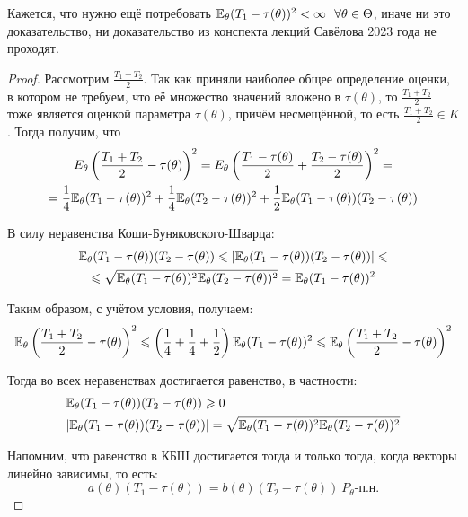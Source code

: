 \begin{note}
    Кажется, что нужно ещё потребовать $\E_\theta (T_1 - \tau(\theta))^2 < \infty \ \ \forall \theta \in \Theta$, иначе ни это доказательство, ни доказательство из конспекта лекций Савёлова 2023 года не проходят.
\end{note}

\begin{proof}
    Рассмотрим $\frac{T_1+T_2}{2}$. Так как приняли наиболее общее определение оценки, в котором не требуем, что её множество значений вложено в $\tau(\theta)$, то $\frac{T_1+T_2}{2}$ тоже является оценкой параметра $\tau(\theta)$, причём несмещённой, то есть $\frac{T_1+T_2}{2} \in K$. Тогда получим, что
    \begin{multline*}
        E_\theta \left(\frac{T_1+T_2}{2} - \tau(\theta)\right)^2 = E_\theta \left(\frac{T_1-\tau(\theta)}{2} + \frac{T_2-\tau(\theta)}{2}\right)^2 =
        \\
        = \frac{1}{4} \mathbb{E}_\theta (T_1 - \tau(\theta))^2 + \frac{1}{4} \mathbb{E}_\theta (T_2 - \tau(\theta))^2 + \frac{1}{2} \mathbb{E}_\theta (T_1 - \tau(\theta)) (T_2 - \tau(\theta))
    \end{multline*}

    В силу неравенства Коши-Буняковского-Шварца:
    \begin{multline*}
        \mathbb{E}_\theta (T_1 - \tau(\theta)) (T_2 - \tau(\theta)) \leqslant |\mathbb{E}_\theta (T_1 - \tau(\theta)) (T_2 - \tau(\theta))| \leqslant
        \\
        \leqslant \sqrt{\mathbb{E}_\theta (T_1 - \tau(\theta))^2 \mathbb{E}_\theta (T_2 - \tau(\theta))^2} = \mathbb{E}_\theta (T_1 - \tau(\theta))^2
    \end{multline*}

    Таким образом, с учётом условия, получаем:
    \[
        \mathbb{E}_\theta \left(\frac{T_1+T_2}{2} - \tau(\theta)\right)^2 \leqslant \left(\frac{1}{4}+\frac{1}{4}+\frac{1}{2}\right) \mathbb{E}_\theta (T_1 - \tau(\theta))^2 \leqslant \mathbb{E}_\theta \left(\frac{T_1+T_2}{2} - \tau(\theta)\right)^2
    \]

    Тогда во всех неравенствах достигается равенство, в частности:
    \begin{align*}
        & \mathbb{E}_\theta (T_1 - \tau(\theta)) (T_2 - \tau(\theta)) \geqslant 0
        \\
        & |\mathbb{E}_\theta (T_1 - \tau(\theta)) (T_2 - \tau(\theta))| = \sqrt{\mathbb{E}_\theta (T_1 - \tau(\theta))^2 \mathbb{E}_\theta (T_2 - \tau(\theta))^2}
    \end{align*}

    Напомним, что равенство в КБШ достигается тогда и только тогда, когда векторы линейно зависимы, то есть:
    \[
        a(\theta) (T_1 - \tau(\theta)) = b(\theta) (T_2 - \tau(\theta)) \ P_\theta\text{-п.н.}
    \]


\end{proof}
